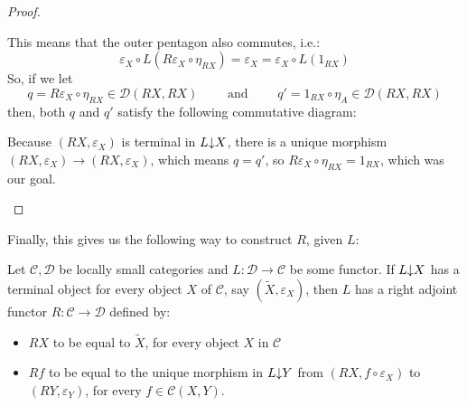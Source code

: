 \begin{proof}
\begin{itemize}
This means that the outer pentagon also commutes, i.e.:
\[\varepsilon_X\circ L(R\varepsilon_X\circ\eta_{RX})=\varepsilon_X=\varepsilon_X\circ L(1_{RX})\]
So, if we let
\[q=R\varepsilon_X\circ\eta_{RX}\in\mathcal{D}(RX,RX)\qquad\text{ and }\qquad q'=1_{RX}\circ\eta_A\in\mathcal{D}(RX,RX)\]
then, both $q$ and $q'$ satisfy the following commutative diagram:
\begin{center}
\end{center}
Because $(RX,\varepsilon_X)$ is terminal in $L\mkern-5mu\downarrow\mkern-5mu X$, there is a unique morphism $(RX,\varepsilon_X)\to(RX,\varepsilon_X)$, which means $q=q'$, so $R\varepsilon_X\circ\eta_{RX}=1_{RX}$, which was our goal.
\end{itemize}
\end{proof}
Finally, this gives us the following way to construct $R$, given $L$:
\begin{corollary}[co-2.3.7] Let $\mathcal{C},\mathcal{D}$ be locally small categories and $L:\mathcal{D}\to\mathcal{C}$ be some functor. If $L\mkern-5mu\downarrow\mkern-5mu X$ has a terminal object for every object $X$ of $\mathcal{C}$, say $(\tilde{X},\varepsilon_X)$, then $L$ has a right adjoint functor $R:\mathcal{C}\to\mathcal{D}$ defined by:
\begin{itemize}
\item $RX$ to be equal to $\tilde{X}$, for every object $X$ in $\mathcal{C}$
\item $Rf$ to be equal to the unique morphism in $L\mkern-5mu\downarrow\mkern-5mu Y$ from $(RX,f\circ\varepsilon_X)$ to $(RY,\varepsilon_Y)$, for every $f\in\mathcal{C}(X,Y)$.
\end{itemize}
\end{corollary}
